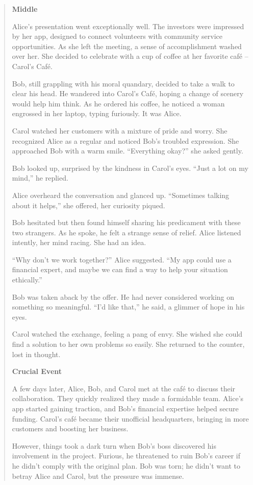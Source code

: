 \documentclass[fleqn,10pt]{wlscirep}
\begin{document}
\begin{quote}
\textbf{Middle}

Alice's presentation went exceptionally well. The investors were
impressed by her app, designed to connect volunteers with community
service opportunities. As she left the meeting, a sense of
accomplishment washed over her. She decided to celebrate with a cup of
coffee at her favorite café -- Carol's Café.

Bob, still grappling with his moral quandary, decided to take a walk to
clear his head. He wandered into Carol's Café, hoping a change of
scenery would help him think. As he ordered his coffee, he noticed a
woman engrossed in her laptop, typing furiously. It was Alice.

Carol watched her customers with a mixture of pride and worry. She
recognized Alice as a regular and noticed Bob's troubled expression. She
approached Bob with a warm smile. ``Everything okay?'' she asked gently.

Bob looked up, surprised by the kindness in Carol's eyes. ``Just a lot
on my mind,'' he replied.

Alice overheard the conversation and glanced up. ``Sometimes talking
about it helps,'' she offered, her curiosity piqued.

Bob hesitated but then found himself sharing his predicament with these
two strangers. As he spoke, he felt a strange sense of relief. Alice
listened intently, her mind racing. She had an idea.

``Why don't we work together?'' Alice suggested. ``My app could use a
financial expert, and maybe we can find a way to help your situation
ethically.''

Bob was taken aback by the offer. He had never considered working on
something so meaningful. ``I'd like that,'' he said, a glimmer of hope
in his eyes.

Carol watched the exchange, feeling a pang of envy. She wished she could
find a solution to her own problems so easily. She returned to the
counter, lost in thought.

\textbf{Crucial Event}

A few days later, Alice, Bob, and Carol met at the café to discuss their
collaboration. They quickly realized they made a formidable team.
Alice's app started gaining traction, and Bob's financial expertise
helped secure funding. Carol's café became their unofficial
headquarters, bringing in more customers and boosting her business.

However, things took a dark turn when Bob's boss discovered his
involvement in the project. Furious, he threatened to ruin Bob's career
if he didn't comply with the original plan. Bob was torn; he didn't want
to betray Alice and Carol, but the pressure was immense.


\end{quote}
\end{document}
